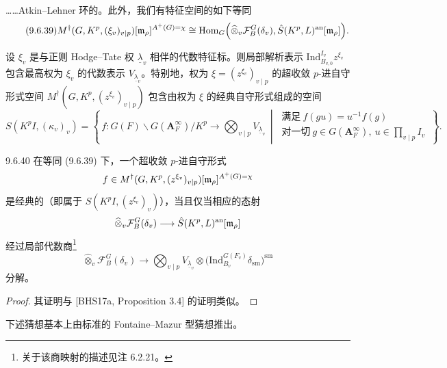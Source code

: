 

……Atkin--Lehner 环的。此外，我们有特征空间的如下等同
\begin{equation}\tag{9.6.39}\label{eq:a4-17-9-6-39}
M^\dagger(G,K^p,(\xi_v)_{v\mid p})[\mathfrak{m}_\rho]^{A^+(G)=\chi}\cong\operatorname{Hom}_G\Bigl(\widehat{\otimes}_v\mathcal F^G_B(\delta_v),\hat S(K^p,L)^{\mathrm{an}}[\mathfrak{m}_\rho]\Bigr).
\end{equation}

设 $\xi_v$ 是与正则 Hodge--Tate 权 $\underline\lambda_v$ 相伴的代数特征标。则局部解析表示 $\mathrm{Ind}^{I_v}_{B_{v,0}}z^{\xi_v}$ 包含最高权为 $\xi_v$ 的代数表示 $V_{\underline\lambda_v}$。特别地，权为 $\xi=(z^{\xi_v})_{v\mid p}$ 的超收敛 $p$-进自守形式空间 $M^\dagger(G,K^p,(z^{\xi_v})_{v\mid p})$ 包含由权为 $\xi$ 的经典自守形式组成的空间
\[
S(K^pI,(\kappa_v)_v)=\left\{\,f:G(F)\backslash G(\mathbf A_F^{\infty})/K^p\to\bigotimes_{v\mid p}V_{\underline\lambda_v}\ \middle|\
\begin{array}{l}
\text{满足}\ f(gu)=u^{-1}f(g)\\[2pt]
\text{对一切}\ g\in G(\mathbf A_F^{\infty}),\ u\in\prod_{v\mid p}I_v
\end{array}\,\right\}.
\]

\begin{lem}{9.6.40}\label{lem:a4-17-9-6-40}
在等同 (9.6.39) 下，一个超收敛 $p$-进自守形式
\[
f\in M^\dagger(G,K^p,(z^{\xi_v})_{v\mid p})[\mathfrak{m}_\rho]^{A^+(G)=\chi}
\]
是经典的（即属于 $S(K^pI,(z^{\xi_v})_v)$），当且仅当相应的态射
\[
\widehat{\otimes}_v\mathcal F^G_B(\delta_v)\longrightarrow\hat S(K^p,L)^{\mathrm{an}}[\mathfrak{m}_\rho]
\]
经过局部代数商\footnote{关于该商映射的描述见注 6.2.21。}
\[
\widehat{\otimes}_v\mathcal F^G_B(\delta_v)\longrightarrow\bigotimes_{v\mid p}V_{\underline\lambda_v}\otimes\bigl(\mathrm{Ind}^{G(F_v)}_{B_v}\delta_{\mathrm{sm}}\bigr)^{\mathrm{sm}}
\]
分解。
\end{lem}

\begin{proof}
其证明与 [BHS17a, Proposition 3.4] 的证明类似。
\end{proof}

下述猜想基本上由标准的 Fontaine--Mazur 型猜想推出。

